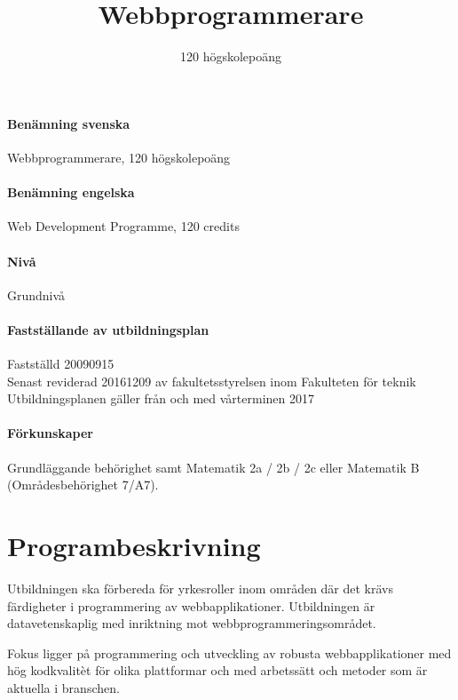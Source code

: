 \documentclass[swedish]{LnuCmThesis}
\title{Webbprogrammerare}
\subtitle{120 högskolepoäng}
\begin{document}
\maketitle

\paragraph{Benämning svenska}

Webbprogrammerare, 120 högskolepoäng

\paragraph{Benämning engelska}

Web Development Programme, 120 credits

\paragraph{Nivå}

Grundnivå

\paragraph{Fastställande av utbildningsplan}

Fastställd 2009­09­15\\
Senast reviderad 2016­12­09 av fakultetsstyrelsen inom Fakulteten för teknik\\
Utbildningsplanen gäller från och med vårterminen 2017

\paragraph{Förkunskaper}

Grundläggande behörighet samt Matematik 2a / 2b / 2c eller Matematik B\\
(Områdesbehörighet 7/A7).

\section*{Programbeskrivning}

Utbildningen ska förbereda för yrkesroller inom områden där det krävs färdigheter i
programmering av webbapplikationer. Utbildningen är datavetenskaplig med inriktning
mot webbprogrammeringsområdet.

Fokus ligger på programmering och utveckling av robusta webbapplikationer med hög
kodkvalitèt för olika plattformar och med arbetssätt och metoder som är aktuella i
branschen.
\end{document}
